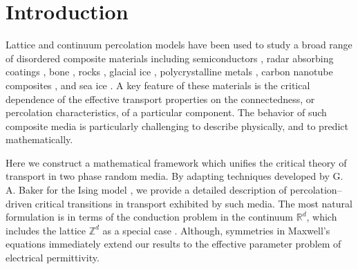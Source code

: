 \documentclass[english,12pt,jmp,graphicx]{revtex4-1}
\begin{document}

\maketitle %

%
\section{Introduction}\label{sec:Introduction}
%
Lattice and continuum percolation models have been used to study a
broad range of disordered composite materials including semiconductors 
\cite{Efros-84}, radar absorbing coatings \cite{Kusy:N-58},
bone
\cite{Sasaki:JTB:25,Golden:JoB:337},
rocks \cite{Bourbie:JGR-11524,Broadbent:PCPS-629}, 
glacial ice \cite{Enting:1985:LSM}, polycrystalline metals
\cite{Chen:PRL:2007}, carbon nanotube composites
\cite{Kyrylyuk:PNAS:2008}, and sea ice
\cite{Golden:2007:GRL,Golden:S-2238}. A key 
feature of these materials is the critical dependence of the effective
transport properties on the connectedness, or percolation
characteristics, of a particular component. The behavior of such
composite media is particularly challenging to describe physically,
and to predict mathematically.  

Here we construct a mathematical framework which unifies the critical
theory of transport in two phase random media. By adapting techniques
developed by G. A. Baker for the Ising model \cite{Baker-1990}, we
provide a detailed description of percolation--driven critical
transitions in transport exhibited by such media. The most natural
formulation is in terms of the conduction problem in the continuum
$\mathbb{R}^d$, which includes the lattice $\mathbb{Z}^d$ as a special
case \cite{Golden:JMP-5627,Golden:CMP-473}. Although, symmetries
in Maxwell's equations \cite{MILTON:2002:TC} immediately extend our
results to the effective parameter problem of electrical
permittivity.
\end{document}
